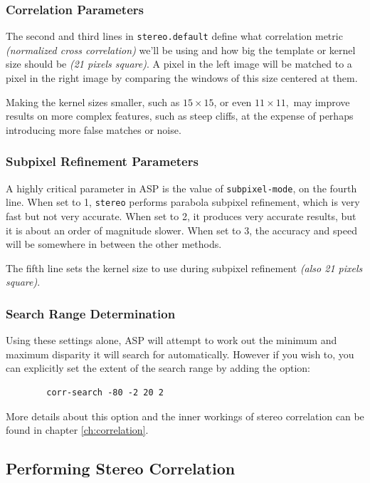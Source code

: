 \subsubsection*{Correlation Parameters}

The second and third lines in \texttt{stereo.default} define what
correlation metric \textit{(normalized cross correlation)} we'll be
using and how big the template or kernel size should be \textit{(21
pixels square)}. A pixel in the left image will be matched to a pixel in
the right image by comparing the windows of this size centered at them.

Making the kernel sizes smaller, such as $15 \times 15$, or even $11
\times 11,$ may improve results on more complex features, such as steep
cliffs, at the expense of perhaps introducing more false matches or
noise.

\subsubsection*{Subpixel Refinement Parameters}

A highly critical parameter in \ac{ASP} is the value of
\texttt{subpixel-mode}, on the fourth line. When set to 1,
\texttt{stereo} performs parabola subpixel refinement, which is very
fast but not very accurate. When set to 2, it produces very accurate
results, but it is about an order of magnitude slower. When set to 3,
the accuracy and speed will be somewhere in between the other methods.

The fifth line sets the kernel size to use during subpixel refinement
\textit{(also 21 pixels square)}.

\subsubsection*{Search Range Determination}

Using these settings alone, \ac{ASP} will attempt to work out the
minimum and maximum disparity it will search for automatically. However if you
wish to, you can explicitly set the extent of the search range by
adding the option:
\begin{verbatim}
        corr-search -80 -2 20 2
\end{verbatim}

More details about this option and the inner workings of stereo correlation
can be found in chapter \ref{ch:correlation}.

\subsection{Performing Stereo Correlation}
\label{perform-stereo}

